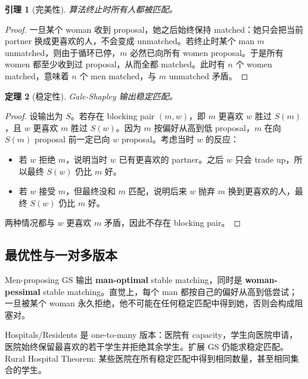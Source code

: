 \documentclass[UTF8,a4paper,11pt]{ctexart}
\newtheorem{theorem}{定理}[section]
\newtheorem{lemma}[theorem]{引理}
\begin{document}
\begin{lemma}[完美性]
算法终止时所有人都被匹配。
\end{lemma}
\begin{proof}
一旦某个 woman 收到 proposal，她之后始终保持 matched：她只会把当前 partner 换成更喜欢的人，不会变成 unmatched。若终止时某个 man $m$ unmatched，则由于循环已停，$m$ 必然已向所有 women proposal。于是所有 women 都至少收到过 proposal，从而全都 matched。此时有 $n$ 个 women matched，意味着 $n$ 个 men matched，与 $m$ unmatched 矛盾。
\end{proof}

\begin{theorem}[稳定性]
Gale-Shapley 输出稳定匹配。
\end{theorem}
\begin{proof}
设输出为 $S$。若存在 blocking pair $(m,w)$，即 $m$ 更喜欢 $w$ 胜过 $S(m)$，且 $w$ 更喜欢 $m$ 胜过 $S(w)$。因为 $m$ 按偏好从高到低 proposal，$m$ 在向 $S(m)$ proposal 前一定已向 $w$ proposal。考虑当时 $w$ 的反应：
\begin{itemize}
  \item 若 $w$ 拒绝 $m$，说明当时 $w$ 已有更喜欢的 partner。之后 $w$ 只会 trade up，所以最终 $S(w)$ 仍比 $m$ 好。
  \item 若 $w$ 接受 $m$，但最终没和 $m$ 匹配，说明后来 $w$ 抛弃 $m$ 换到更喜欢的人，最终 $S(w)$ 仍比 $m$ 好。
\end{itemize}
两种情况都与 $w$ 更喜欢 $m$ 矛盾，因此不存在 blocking pair。
\end{proof}

\subsection{最优性与一对多版本}

Men-proposing GS 输出 \textbf{man-optimal} stable matching，同时是 \textbf{woman-pessimal} stable matching。直觉上，每个 man 都按自己的偏好从高到低尝试；一旦被某个 woman 永久拒绝，他不可能在任何稳定匹配中得到她，否则会构成阻塞对。

Hospitals/Residents 是 one-to-many 版本：医院有 capacity，学生向医院申请，医院始终保留最喜欢的若干学生并拒绝其余学生。扩展 GS 仍能求稳定匹配。Rural Hospital Theorem: 某些医院在所有稳定匹配中得到相同数量，甚至相同集合的学生。
\end{document}
